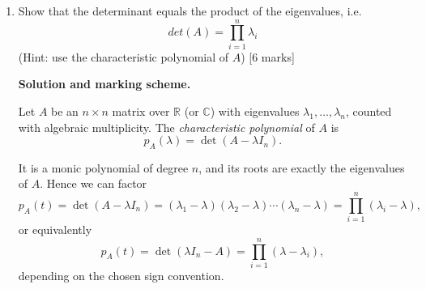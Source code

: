\documentclass{article}
\begin{document}
\begin{enumerate}[label=(\alph*)]
\begin{mdframed}[linecolor=black, linewidth=1pt]
    From the third equation: $\alpha_2 + \alpha_3 = 0\Rightarrow \alpha_2 = -\alpha_3$.
    
    Substitute into the first two equations:
    
    First equation:
    \[
    \alpha_1 + 2(-\alpha_3) + 3\alpha_3 = \alpha_1 + \alpha_3 = 0
    \quad\Rightarrow\quad \alpha_1 = -\alpha_3.
    \]
    
    Second equation:
    \[
    \alpha_1 + 3(-\alpha_3) + 4\alpha_3 = \alpha_1 + \alpha_3 = 0,
    \]
    which is the same condition.
    
    Thus
    \[
    \alpha_1 = -\alpha_3,\quad \alpha_2 = -\alpha_3,
    \]
    so
    \[
    (\alpha_1,\alpha_2,\alpha_3) = (-\alpha_3,-\alpha_3,\alpha_3) = \alpha_3(-1,-1,1).
    \]
    There is a nontrivial solution (take e.g.\ $\alpha_3=1$), so the vectors are linearly \emph{dependent}.
    
    Equivalently, note directly that
    \[
    \mathbf{x}_1 + \mathbf{x}_2 - \mathbf{x}_3 = \mathbf{0},
    \]
    so $\mathbf{x}_3 = \mathbf{x}_1+\mathbf{x}_2$ and the set is not linearly independent.
    
    \textbf{Marks (2):}
    \begin{itemize}
      \item 1 mark: sets up and solves the system, or explicitly finds a nontrivial relation such as $\mathbf{x}_1 + \mathbf{x}_2 - \mathbf{x}_3=0$.
      \item 1 mark: clearly states the conclusion that the vectors are linearly \emph{dependent}.
    \end{itemize}
    
    \end{mdframed}
    
    \item Show that the determinant equals the product of the eigenvalues, i.e.
    \[
    det(A) = \prod_{i=1}^n \lambda_i
    \]
    (Hint: use the characteristic polynomial of $A$) [6 marks]

    \begin{mdframed}[linecolor=black, linewidth=1pt]
    \textbf{Solution and marking scheme.}

    Let $A$ be an $n\times n$ matrix over $\mathbb{R}$ (or $\mathbb{C}$) with eigenvalues $\lambda_1,\dots,\lambda_n$, counted with algebraic multiplicity. The \emph{characteristic polynomial} of $A$ is
    \[
    p_A(\lambda) = \det(A - \lambda I_n).
    \]
    
    It is a monic polynomial of degree $n$, and its roots are exactly the eigenvalues of $A$. Hence we can factor
    \[
    p_A(t) = \det(A - \lambda I_n) = (\lambda_1 - \lambda)(\lambda_2 - \lambda) \cdots (\lambda_n - \lambda) = \prod_{i=1}^n (\lambda_i - \lambda),
    \]
    or equivalently
    \[
    p_A(t) = \det(\lambda I_n - A) =  \prod_{i=1}^n (\lambda - \lambda_i),
    \]
    depending on the chosen sign convention.
    

\end{mdframed}
\end{enumerate}
\end{document}

